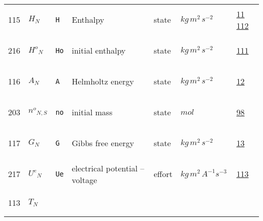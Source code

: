 \begin{longtable}{|p{1cm}|p{2.5cm}|p{4.5cm}|p{8cm}|p{3.0cm}|p{3cm}|p{1cm}|}
                 \\
            115
             & \hypertarget{"v:115"}{ $ {H}{_{N}} $}
             & \verb|H|
             & Enthalpy
             & \begin{lay}state \end{lay}
             & $ kg \,m^{2} \,s^{-2} \, $
             &                 \hyperlink{"e:11"}{ 11 }
                                 \hyperlink{"e:112"}{ 112 }
                 \\
            216
             & \hypertarget{"v:216"}{ $ {{H^o}}{_{N}} $}
             & \verb|Ho|
             & initial enthalpy
             & \begin{lay}state \end{lay}
             & $ kg \,m^{2} \,s^{-2} \, $
             &                 \hyperlink{"e:111"}{ 111 }
                 \\
            116
             & \hypertarget{"v:116"}{ $ {A}{_{N}} $}
             & \verb|A|
             & Helmholtz energy
             & \begin{lay}state \end{lay}
             & $ kg \,m^{2} \,s^{-2} \, $
             &                 \hyperlink{"e:12"}{ 12 }
                 \\
            203
             & \hypertarget{"v:203"}{ $ {{n^o}}{_{N, S}} $}
             & \verb|no|
             & initial mass
             & \begin{lay}state \end{lay}
             & $ mol \, $
             &                 \hyperlink{"e:98"}{ 98 }
                 \\
            117
             & \hypertarget{"v:117"}{ $ {G}{_{N}} $}
             & \verb|G|
             & Gibbs free energy
             & \begin{lay}state \end{lay}
             & $ kg \,m^{2} \,s^{-2} \, $
             &                 \hyperlink{"e:13"}{ 13 }
                 \\
            217
             & \hypertarget{"v:217"}{ $ {{U^e}}{_{N}} $}
             & \verb|Ue|
             & electrical potential -- voltage
             & \begin{lay}effort \end{lay}
             & $ kg \,m^{2} \,A^{-1} s^{-3} \, $
             &                 \hyperlink{"e:113"}{ 113 }
                 \\
            113
             & \hypertarget{"v:113"}{ $ {T}{_{N}} $}

\end{longtable}
